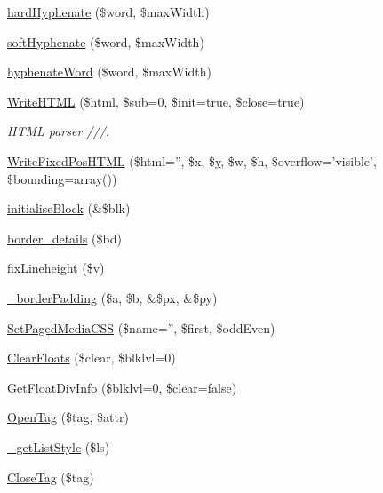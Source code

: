 \begin{DoxyCompactItemize}
\item 
\hyperlink{classm_p_d_f_a4c81e1a09dd42dd3d54e765bd485100e}{hard\-Hyphenate} (\$word, \$max\-Width)
\item 
\hyperlink{classm_p_d_f_a736dd7da9ce07f01edd300539b7c30ce}{soft\-Hyphenate} (\$word, \$max\-Width)
\item 
\hyperlink{classm_p_d_f_a9a780cbd253230ef8cbf428351255049}{hyphenate\-Word} (\$word, \$max\-Width)
\item 
\hyperlink{classm_p_d_f_a399521a4ab38536f9d26e46aa6ab3020}{Write\-H\-T\-M\-L} (\$html, \$sub=0, \$init=true, \$close=true)
\begin{DoxyCompactList}\small\item\em H\-T\-M\-L parser ///. \end{DoxyCompactList}\item 
\hyperlink{classm_p_d_f_ad0871d9847a7b0d63ef561f777121822}{Write\-Fixed\-Pos\-H\-T\-M\-L} (\$html='', \$x, \$\hyperlink{example43___m_p_d_f_i__booklet_8php_a3f83be162d14f38451e1bc419fbbbcbc}{y}, \$w, \$h, \$overflow='visible', \$bounding=array())
\item 
\hyperlink{classm_p_d_f_ad3565491fbb30f6d9871f46acdf2f92c}{initialise\-Block} (\&\$blk)
\item 
\hyperlink{classm_p_d_f_ac1c96f497fc4be6d791ec67da07cfa66}{border\-\_\-details} (\$bd)
\item 
\hyperlink{classm_p_d_f_a8c0ada7e4371515bb1c80eab712a54d8}{fix\-Lineheight} (\$v)
\item 
\hyperlink{classm_p_d_f_a0b7d4a972f8275fdb8f1d2954713b0c6}{\-\_\-border\-Padding} (\$a, \$b, \&\$px, \&\$py)
\item 
\hyperlink{classm_p_d_f_a03021b4b381e15cbc1171d35b65a7055}{Set\-Paged\-Media\-C\-S\-S} (\$name='', \$first, \$odd\-Even)
\item 
\hyperlink{classm_p_d_f_a7d6fbef7915eebe676c1ef74d67e9157}{Clear\-Floats} (\$clear, \$blklvl=0)
\item 
\hyperlink{classm_p_d_f_a1ece66becced15032a73a85d34c59117}{Get\-Float\-Div\-Info} (\$blklvl=0, \$clear=\hyperlink{ttfontsuni_8php_afbaa04e5cc97693dc668b3c45d3dd740}{false})
\item 
\hyperlink{classm_p_d_f_a762d332440622ed5e85cf848f1a48845}{Open\-Tag} (\$tag, \$attr)
\item 
\hyperlink{classm_p_d_f_a5fe6312f79dd3395880cce17ec92a0b4}{\-\_\-get\-List\-Style} (\$ls)
\item 
\hyperlink{classm_p_d_f_a0e4c556e5ac9b06e5efb7b20a3d6b85d}{Close\-Tag} (\$tag)
\item 

\end{DoxyCompactItemize}
